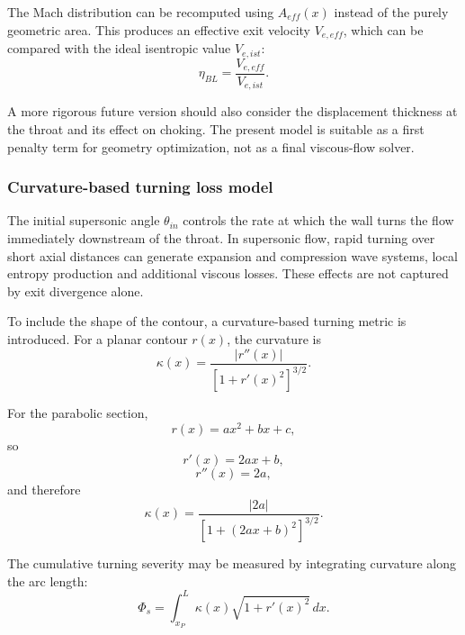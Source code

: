 \documentclass[11pt,a4paper]{article}
\begin{document}
The Mach distribution can be recomputed using $A_{eff}(x)$ instead of the purely geometric area. This produces an effective exit velocity $V_{e,eff}$, which can be compared with the ideal isentropic value $V_{e,ist}$:
\begin{equation}
\boxed{\eta_{BL}=\frac{V_{e,eff}}{V_{e,ist}}}.
\label{eq:eta_BL}
\end{equation}

A more rigorous future version should also consider the displacement thickness at the throat and its effect on choking. The present model is suitable as a first penalty term for geometry optimization, not as a final viscous-flow solver.

\subsubsection{Curvature-based turning loss model}

The initial supersonic angle $\theta_{in}$ controls the rate at which the wall turns the flow immediately downstream of the throat. In supersonic flow, rapid turning over short axial distances can generate expansion and compression wave systems, local entropy production and additional viscous losses. These effects are not captured by exit divergence alone.

To include the shape of the contour, a curvature-based turning metric is introduced. For a planar contour $r(x)$, the curvature is
\begin{equation}
\kappa(x)=\frac{|r''(x)|}{\left[1+r'(x)^2\right]^{3/2}}.
\label{eq:curvature_general}
\end{equation}

For the parabolic section,
\begin{equation}
r(x)=ax^2+bx+c,
\end{equation}
so
\begin{equation}
r'(x)=2ax+b,
\end{equation}
\begin{equation}
r''(x)=2a,
\end{equation}
and therefore
\begin{equation}
\kappa(x)=\frac{|2a|}{\left[1+(2ax+b)^2\right]^{3/2}}.
\label{eq:curvature_parabola}
\end{equation}

The cumulative turning severity may be measured by integrating curvature along the arc length:
\begin{equation}
\Phi_s=\int_{x_P}^{L}\kappa(x)\sqrt{1+r'(x)^2}\,dx.
\label{eq:Phi_s}
\end{equation}
\end{document}
